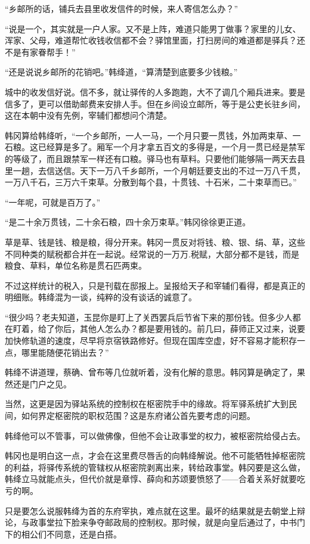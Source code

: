 “乡邮所的话，铺兵去县里收发信件的时候，来人寄信怎么办？”

“说是一个，其实就是一户人家。又不是上阵，难道只能男丁做事？家里的儿女、浑家、父母，难道帮忙收钱收信都不会？驿馆里面，打扫房间的难道都是驿兵？还不是有家眷帮手！”

“还是说说乡邮所的花销吧。”韩绛道，“算清楚到底要多少钱粮。”

城中的收发信好说。信不多，就让驿传的人多跑跑，大不了调几个厢兵进来。要是信多了，更可以借助邮费来安排人手。但在乡间设立邮所，等于是公吏长驻乡间，这在本朝中没有先例，宰辅们都想问个清楚。

韩冈算给韩绛听，“一个乡邮所，一人一马，一个月只要一贯钱，外加两束草、一石粮。这已经算是多了。厢军一个月才拿五百文的多得是，一个月一贯已经是禁军的等级了，而且跟禁军一样还有口粮。驿马也有草料。只要他们能够隔一两天去县里一趟，去信送信。天下一万八千乡邮所，一个月朝廷要支出的不过一万八千贯，一万八千石，三万六千束草。分散到每个县，十贯钱、十石米，二十束草而已。”

“一年呢，可就是百万了。”

“是二十余万贯钱，二十余石粮，四十余万束草。”韩冈徐徐更正道。

草是草、钱是钱、粮是粮，得分开来。韩冈一贯反对将钱、粮、银、绢、草，这些不同种类的赋税都合并在一起说。经常说的一万万.税赋，大部分都不是钱，而是粮食、草料，单位名称是贯石匹两束。

不过这样统计的税入，只是刊载在邸报上。呈报给天子和宰辅们看得，都是真正的明细账。韩绛混为一谈，纯粹的没有谈话的诚意了。

“很少吗？老夫知道，玉昆你是盯上了关西罢兵后节省下来的那份钱。但多少人都在盯着，给了你后，其他人怎么办？都是要用钱的。前几曰，薛师正又过来，说要加快修轨道的速度，尽早将京宿铁路修好。但现在国库空虚，好不容易才能积存一点，哪里能随便花销出去？”

韩绛不讲道理，蔡确、曾布等几位就听着，没有化解的意思。韩冈算是确定了，果然还是门户之见。

当然，这更是因为驿站系统的控制权在枢密院手中的缘故。将军驿系统扩大到民间，如何界定枢密院的职权范围？这是东府诸公首先要考虑的问题。

韩绛他可以不管事，可以做佛像，但他不会让政事堂的权力，被枢密院给侵占去。

韩冈也是明白这一点，才会在这里费尽唇舌的向韩绛解说。他不可能牺牲掉枢密院的利益，将驿传系统的管辖权从枢密院剥离出来，转给政事堂。韩冈要是这么做，韩绛立马就能点头，但代价就是章惇、薛向和苏颂要愤怒了——合着关系好就要吃亏的啊。

只是要怎么说服韩绛为首的东府宰执，难点就在这里。最坏的结果就是去朝堂上辩论，与政事堂拉下脸来争夺邮政局的控制权。那时候，就是向皇后通过了，中书门下的相公们不同意，还是白搭。

